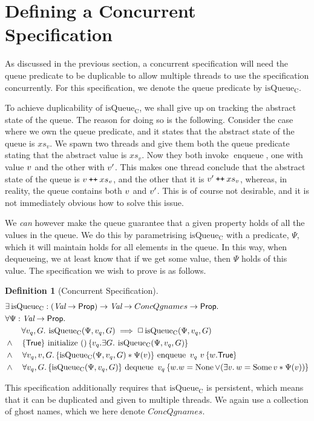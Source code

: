 \documentclass[a4paper, 10pt]{report}
\theoremstyle{definition}
\newtheorem{definition}{Definition}[section]
\newcommand{\initialise}{\operatorname{initialize}}
\newcommand{\enqueue}{\operatorname{enqueue}}
\newcommand{\dequeue}{\operatorname{dequeue}}
\newcommand{\isqueueconc}{\operatorname{isQueue_{C}}}
\newcommand{\ConcQgnames}{ConcQgnames}
\newcommand{\vq}{v_q}
\newcommand{\nodeval}{\valB}
\newcommand{\absvalue}{\val}
\newcommand{\absvalueList}{xs_v}
\newcommand{\Qg}{G}
\newcommand\catenate{\mathbin{\text{\ttfamily\upshape ++}}}
\newcommand{\concspecinitHTGen}[3]{\hoare{\TRUE}{\initialise \ \TT}{#2 . \Exists #3. \isqueueconc(#1, #2, #3)}}
\newcommand{\concspecinitGen}[3]{\concspecinitHTGen{#1}{#2}{#3}}
\newcommand{\concspecinit}[1]{\concspecinitGen{#1}{\vq}{\Qg}}
\newcommand{\concspecenqHT}[4]{\hoare{\isqueueconc(#1, #2, #4) \star{} #1(#3)}{\enqueue \ #2 \ #3}{\valB . \TRUE}}
\newcommand{\concspecenqGen}[4]{\All #2, #3, #4. \concspecenqHT{#1}{#2}{#3}{#4}}
\newcommand{\concspecenq}[1]{\concspecenqGen{#1}{\vq}{\absvalue}{\Qg}}
\newcommand{\concspecdeqHT}[3]{\hoare{\isqueueconc(#1, #2, #3)}{\dequeue \ #2}{\nodeval . \nodeval = \None \lor{} (\Exists \absvalue . \nodeval = \Some \absvalue \star{} #1(\absvalue))}}
\newcommand{\concspecdeqGen}[3]{\All #2, #3. \concspecdeqHT{#1}{#2}{#3}}
\newcommand{\concspecdeq}[1]{\concspecdeqGen{#1}{\vq}{\Qg}}
\begin{document}
\section{Defining a Concurrent Specification}
\label{QueueSpecs:section:conc}

As discussed in the previous section, a concurrent specification will need the queue predicate to be duplicable to allow multiple threads to use the specification concurrently. For this specification, we denote the queue predicate by $\isqueueconc$.

To achieve duplicability of $\isqueueconc$, we shall give up on tracking the abstract state of the queue. The reason for doing so is the following. Consider the case where we own the queue predicate, and it states that the abstract state of the queue is $\absvalueList$. We spawn two threads and give them both the queue predicate stating that the abstract value is $\absvalueList$. Now they both invoke $\enqueue$, one with value $\absvalue$ and the other with $\absvalue'$. This makes one thread conclude that the abstract state of the queue is $\absvalue \catenate \absvalueList$, and the other that it is $\absvalue' \catenate \absvalueList$, whereas, in reality, the queue contains both $\absvalue$ and $\absvalue'$. This is of course not desirable, and it is not immediately obvious how to solve this issue.

We \textit{can} however make the queue guarantee that a given property holds of all the values in the queue. We do this by parametrising $\isqueueconc$ with a predicate, $\Psi$, which it will maintain holds for all elements in the queue. In this way, when dequeueing, we at least know that if we get some value, then $\Psi$ holds of this value. The specification we wish to prove is as follows.
\begin{definition}[Concurrent Specification]\label{QueueSpecs:spec:conc}
\begin{align*}
  &\Exists \isqueueconc : (\Val \to \Prop) \to \Val \to \ConcQgnames \to \Prop.\\
  &\All \Psi : \Val \to \Prop.\\
  &\quad\quad \All \vq, \Qg . \isqueueconc(\Psi, \vq, \Qg) \implies \persistently \isqueueconc(\Psi, \vq, \Qg)\\
  &\land{}\quad\concspecinit{\Psi}\\
  &\land{}\quad\concspecenq{\Psi}\\
  &\land{}\quad\concspecdeq{\Psi}
\end{align*}
\end{definition}
This specification additionally requires that $\isqueueconc$ is persistent, which means that it can be duplicated and given to multiple threads. We again use a collection of ghost names, which we here denote $\ConcQgnames$.
\end{document}
